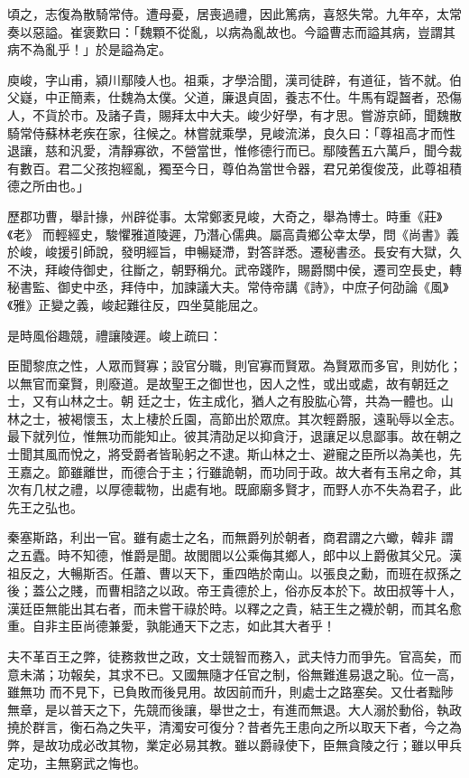 \begin{pinyinscope}
 頃之，志復為散騎常侍。遭母憂，居喪過禮，因此篤病，喜怒失常。九年卒，太常奏以惡謚。崔褒歎曰：「魏顆不從亂，以病為亂故也。今謚曹志而謚其病，豈謂其病不為亂乎！」於是謚為定。



 庾峻，字山甫，潁川鄢陵人也。祖乘，才學洽聞，漢司徒辟，有道征，皆不就。伯父嶷，中正簡素，仕魏為太僕。父道，廉退貞固，養志不仕。牛馬有踶齧者，恐傷人，不貨於市。及諸子貴，賜拜太中大夫。峻少好學，有才思。嘗游京師，聞魏散騎常侍蘇林老疾在家，往候之。林嘗就乘學，見峻流涕，良久曰：「尊祖高才而性退讓，慈和汎愛，清靜寡欲，不營當世，惟修德行而已。鄢陵舊五六萬戶，聞今裁有數百。君二父孩抱經亂，獨至今日，尊伯為當世令器，君兄弟復俊茂，此尊祖積德之所由也。」



 歷郡功曹，舉計掾，州辟從事。太常鄭袤見峻，大奇之，舉為博士。時重《莊》《老》
 而輕經史，駿懼雅道陵遲，乃潛心儒典。屬高貴鄉公幸太學，問《尚書》義於峻，峻援引師說，發明經旨，申暢疑滯，對答詳悉。遷秘書丞。長安有大獄，久不決，拜峻侍御史，往斷之，朝野稱允。武帝踐阼，賜爵關中侯，遷司空長史，轉秘書監、御史中丞，拜侍中，加諫議大夫。常侍帝講《詩》，中庶子何劭論《風》《雅》正變之義，峻起難往反，四坐莫能屈之。



 是時風俗趣競，禮讓陵遲。峻上疏曰：



 臣聞黎庶之性，人眾而賢寡；設官分職，則官寡而賢眾。為賢眾而多官，則妨化；以無官而棄賢，則廢道。是故聖王之御世也，因人之性，或出或處，故有朝廷之士，又有山林之士。朝
 廷之士，佐主成化，猶人之有股肱心膂，共為一體也。山林之士，被褐懷玉，太上棲於丘園，高節出於眾庶。其次輕爵服，遠恥辱以全志。最下就列位，惟無功而能知止。彼其清劭足以抑貪汙，退讓足以息鄙事。故在朝之士聞其風而悅之，將受爵者皆恥躬之不逮。斯山林之士、避寵之臣所以為美也，先王嘉之。節雖離世，而德合于主；行雖詭朝，而功同于政。故大者有玉帛之命，其次有几杖之禮，以厚德載物，出處有地。既廊廟多賢才，而野人亦不失為君子，此先王之弘也。



 秦塞斯路，利出一官。雖有處士之名，而無爵列於朝者，商君謂之六蠍，韓非
 謂之五蠹。時不知德，惟爵是聞。故閭閻以公乘侮其鄉人，郎中以上爵傲其父兄。漢祖反之，大暢斯否。任蕭、曹以天下，重四皓於南山。以張良之勳，而班在叔孫之後；蓋公之賤，而曹相諮之以政。帝王貴德於上，俗亦反本於下。故田叔等十人，漢廷臣無能出其右者，而未嘗干祿於時。以釋之之貴，結王生之襪於朝，而其名愈重。自非主臣尚德兼愛，孰能通天下之志，如此其大者乎！



 夫不革百王之弊，徒務救世之政，文士競智而務入，武夫恃力而爭先。官高矣，而意未滿；功報矣，其求不已。又國無隨才任官之制，俗無難進易退之恥。位一高，雖無功
 而不見下，已負敗而後見用。故因前而升，則處士之路塞矣。又仕者黜陟無章，是以普天之下，先競而後讓，舉世之士，有進而無退。大人溺於動俗，執政撓於群言，衡石為之失平，清濁安可復分？昔者先王患向之所以取天下者，今之為弊，是故功成必改其物，業定必易其教。雖以爵祿使下，臣無貪陵之行；雖以甲兵定功，主無窮武之悔也。




\end{pinyinscope}
